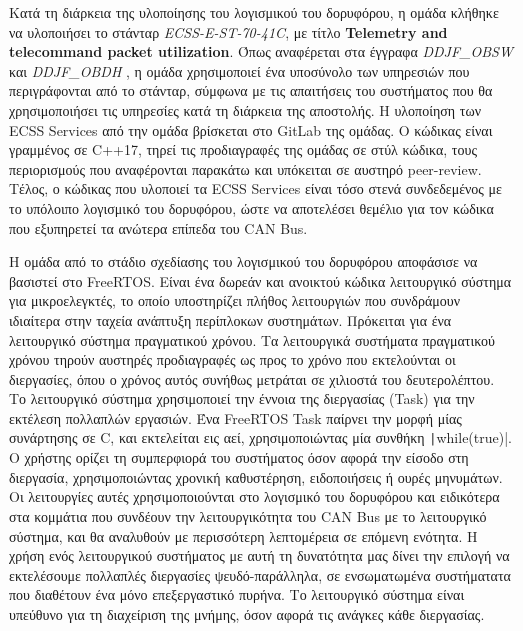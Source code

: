 \documentclass[a4paper,nobib,justified]{tufte-book}
\begin{document}
Κατά τη διάρκεια της υλοποίησης του λογισμικού του δορυφόρου, η ομάδα κλήθηκε να υλοποιήσει το στάνταρ \emph{ECSS-E-ST-70-41C}, με τίτλο \textbf{Telemetry and telecommand packet utilization}. Όπως αναφέρεται στα έγγραφα \emph{DDJF\_OBSW}  και \emph{DDJF\_OBDH} , η ομάδα χρησιμοποιεί ένα υποσύνολο των υπηρεσιών που περιγράφονται από το στάνταρ, σύμφωνα με τις απαιτήσεις του συστήματος που θα χρησιμοποιήσει τις υπηρεσίες κατά τη διάρκεια της αποστολής. Η υλοποίηση των ECSS Services από την ομάδα βρίσκεται στο GitLab της ομάδας. Ο κώδικας είναι γραμμένος σε C++17, τηρεί τις προδιαγραφές της ομάδας σε στύλ κώδικα, τους περιορισμούς που αναφέρονται παρακάτω και υπόκειται σε αυστηρό peer-review. Τέλος, ο κώδικας που υλοποιεί τα ECSS Services είναι τόσο στενά συνδεδεμένος με το υπόλοιπο λογισμικό του δορυφόρου, ώστε να αποτελέσει θεμέλιο για τον κώδικα που εξυπηρετεί τα ανώτερα επίπεδα του CAN Bus. 


\par Η ομάδα από το στάδιο σχεδίασης του λογισμικού του δορυφόρου αποφάσισε να βασιστεί στο FreeRTOS. Είναι ένα δωρεάν και ανοικτού κώδικα λειτουργικό σύστημα για μικροελεγκτές, το οποίο υποστηρίζει πλήθος λειτουργιών που συνδράμουν ιδιαίτερα στην ταχεία ανάπτυξη περίπλοκων συστημάτων. Πρόκειται για ένα λειτουργικό σύστημα πραγματικού χρόνου. Τα λειτουργικά συστήματα πραγματικού χρόνου τηρούν αυστηρές προδιαγραφές ως προς το χρόνο που εκτελούνται οι διεργασίες, όπου ο χρόνος αυτός συνήθως μετράται σε χιλιοστά του δευτερολέπτου. Το λειτουργικό σύστημα χρησιμοποιεί την έννοια της διεργασίας (Task) για την εκτέλεση πολλαπλών εργασιών. Ένα FreeRTOS Task παίρνει την μορφή μίας συνάρτησης σε C, και εκτελείται εις αεί, χρησιμοποιώντας μία συνθήκη \texttt|while(true)|. Ο χρήστης ορίζει τη συμπερφιορά του συστήματος όσον αφορά την είσοδο στη διεργασία, χρησιμοποιώντας χρονική καθυστέρηση, ειδοποιήσεις ή ουρές μηνυμάτων. Οι λειτουργίες αυτές χρησιμοποιούνται στο λογισμικό του δορυφόρου και ειδικότερα στα κομμάτια που συνδέουν την λειτουργικότητα του CAN Bus με το λειτουργικό σύστημα, και θα αναλυθούν με περισσότερη λεπτομέρεια σε επόμενη ενότητα. Η χρήση ενός λειτουργικού συστήματος με αυτή τη δυνατότητα μας δίνει την επιλογή να εκτελέσουμε πολλαπλές διεργασίες ψευδό-παράλληλα, σε ενσωματωμένα συστήματατα που διαθέτουν ένα μόνο επεξεργαστικό πυρήνα. Το λειτουργικό σύστημα είναι υπεύθυνο για τη διαχείριση της μνήμης, όσον αφορά τις ανάγκες κάθε διεργασίας.
\end{document}
